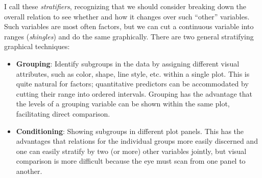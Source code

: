 \documentclass[
  letterpaper,
  10pt,
  krantz2]{krantz}
\begin{document}
I call these \emph{stratifiers}, recognizing that we should consider
breaking down the overall relation to see whether and how it changes
over such ``other'' variables. Such variables are most often factors,
but we can cut a continuous variable into ranges (\emph{shingles}) and
do the same graphically. There are two general stratifying graphical
techniques:

\begin{itemize}
\item
  \textbf{Grouping}: Identify subgroups in the data by assigning
  different visual attributes, such as color, shape, line style, etc.
  within a single plot. This is quite natural for factors; quantitative
  predictors can be accommodated by cutting their range into ordered
  intervals. Grouping has the advantage that the levels of a grouping
  variable can be shown within the same plot, facilitating direct
  comparison.
\item
  \textbf{Conditioning}: Showing subgroups in different plot panels.
  This has the advantages that relations for the individual groups more
  easily discerned and one can easily stratify by two (or more) other
  variables jointly, but visual comparison is more difficult because the
  eye must scan from one panel to another.
\end{itemize}
\end{document}
